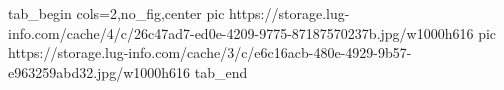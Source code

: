  
 
 
 
 


\ifcmt
  tab_begin cols=2,no_fig,center
     pic https://storage.lug-info.com/cache/4/c/26c47ad7-ed0e-4209-9775-87187570237b.jpg/w1000h616
		 pic https://storage.lug-info.com/cache/3/c/e6c16acb-480e-4929-9b57-e963259abd32.jpg/w1000h616
  tab_end
\fi
